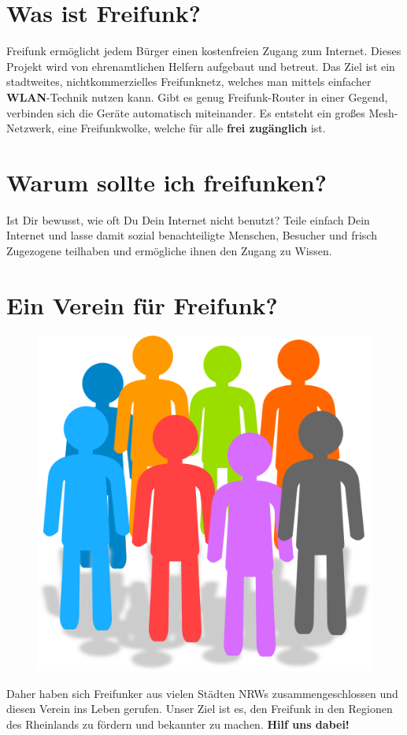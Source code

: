 \documentclass[10pt]{scrartcl}
\begin{document}
\section{\normalsize Was ist Freifunk?}
Freifunk ermöglicht jedem Bürger einen kostenfreien Zugang zum Internet. Dieses Projekt wird von ehrenamtlichen Helfern aufgebaut und betreut. Das Ziel ist ein stadtweites, nichtkommerzielles Freifunknetz, welches man mittels einfacher \textbf{WLAN}-Technik nutzen kann. Gibt es genug Freifunk-Router in einer Gegend, verbinden sich die Geräte automatisch miteinander. Es entsteht ein großes Mesh-Netzwerk, eine \glqq Freifunkwolke\grqq, welche für alle \textbf{frei zugänglich} ist.

\section{\normalsize Warum sollte ich freifunken?}
Ist Dir bewusst, wie oft Du Dein Internet nicht benutzt? Teile einfach Dein Internet und lasse damit sozial benachteiligte Menschen, Besucher und frisch Zugezogene teilhaben und ermögliche ihnen den Zugang zu Wissen.

\section{\normalsize Ein Verein für Freifunk?}
\begin{figure}
\includegraphics[scale=0.2]{Verein}
\end{figure}
Daher haben sich Freifunker aus vielen Städten NRWs zusammengeschlossen und diesen Verein ins Leben gerufen.
Unser Ziel ist es, den Freifunk in den Regionen des Rheinlands zu fördern und bekannter zu machen.
\textbf{Hilf uns dabei!}
\end{document}
